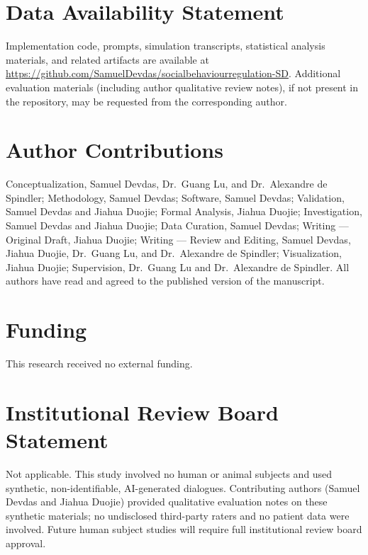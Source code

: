 \section{Data Availability Statement}\label{data-availability-statement}

Implementation code, prompts, simulation transcripts, statistical analysis materials, and related artifacts are available at \url{https://github.com/SamuelDevdas/socialbehaviourregulation-SD}. Additional evaluation materials (including author qualitative review notes), if not present in the repository, may be requested from the corresponding author.

\section{Author Contributions}\label{author-contributions}

Conceptualization, Samuel Devdas, Dr.~Guang Lu, and Dr.~Alexandre de Spindler; Methodology, Samuel Devdas; Software, Samuel Devdas; Validation, Samuel Devdas and Jiahua Duojie; Formal Analysis, Jiahua Duojie; Investigation, Samuel Devdas and Jiahua Duojie; Data Curation, Samuel Devdas; Writing --- Original Draft, Jiahua Duojie; Writing --- Review and Editing, Samuel Devdas, Jiahua Duojie, Dr.~Guang Lu, and Dr.~Alexandre de Spindler; Visualization, Jiahua Duojie; Supervision, Dr.~Guang Lu and Dr.~Alexandre de Spindler. All authors have read and agreed to the published version of the manuscript.

\section{Funding}\label{funding}

This research received no external funding.

\section{Institutional Review Board Statement}\label{institutional-review-board-statement}

Not applicable. This study involved no human or animal subjects and used synthetic, non-identifiable, AI-generated dialogues. Contributing authors (Samuel Devdas and Jiahua Duojie) provided qualitative evaluation notes on these synthetic materials; no undisclosed third-party raters and no patient data were involved. Future human subject studies will require full institutional review board approval.

